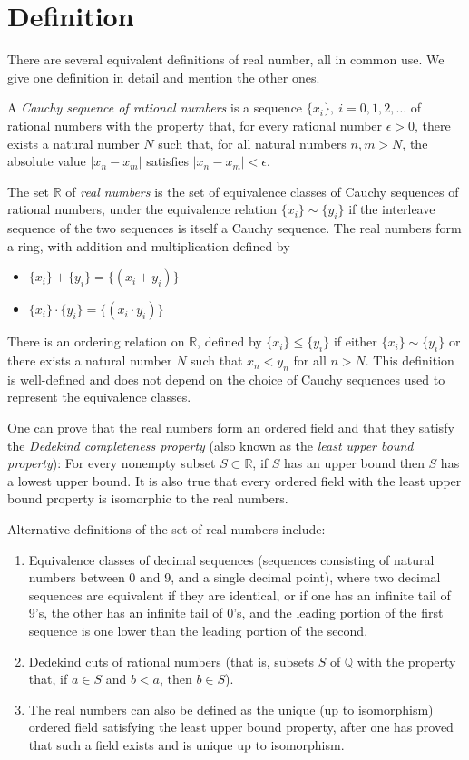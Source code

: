\documentclass[12pt]{article}
\begin{document}
\section{Definition}
There are several equivalent definitions of real number, all in common use. We give one definition in detail and mention the other ones.

A {\em Cauchy sequence of rational numbers} is a sequence $\{x_i\},\ i=0,1,2,\dots$ of rational numbers with the property that, for every rational number $\epsilon > 0$, there exists a natural number $N$ such that, for all natural numbers $n,m > N$, the absolute value $|x_n - x_m|$ satisfies $|x_n - x_m| < \epsilon$.

The set $\mathbb{R}$ of {\em real numbers} is the set of equivalence classes of Cauchy sequences of rational numbers, under the equivalence relation $\{x_i\} \sim \{y_i\}$ if the interleave sequence of the two sequences is itself a Cauchy sequence.
The real numbers form a ring, with addition and multiplication defined by
\begin{itemize}
\item $\{x_i\} + \{y_i\} = \{(x_i+y_i)\}$
\item $\{x_i\} \cdot \{y_i\} = \{(x_i \cdot y_i)\}$
\end{itemize}
There is an ordering relation on $\mathbb{R}$, defined by $\{x_i\} \leq \{y_i\}$ if either $\{x_i\} \sim \{y_i\}$ or there exists a natural number $N$ such that $x_n < y_n$ for all $n > N$. This definition is well-defined and does not depend on the choice of Cauchy sequences used to represent the equivalence classes.

One can prove that the real numbers form an ordered field and that they satisfy the \emph{Dedekind completeness property} (also known as the \emph{least upper bound property}): For every nonempty subset $S \subset \mathbb{R}$, if $S$ has an upper bound then $S$ has a lowest upper bound. It is also true that every ordered field with the least upper bound property is isomorphic to the real numbers.

Alternative definitions of the set of real numbers include:
\begin{enumerate}
\item Equivalence classes of decimal sequences (sequences consisting of natural numbers between 0 and 9, and a single decimal point), where two decimal sequences are equivalent if they are identical, or if one has an infinite tail of 9's, the other has an infinite tail of 0's, and the leading portion of the first sequence is one lower than the leading portion of the second.
\item Dedekind cuts of rational numbers (that is, subsets $S$ of $\mathbb{Q}$ with the property that, if $a \in S$ and $b < a$, then $b \in S$).
\item The real numbers can also be defined as the unique (up to isomorphism) ordered field satisfying the least upper bound property, after one has proved that such a field exists and is unique up to isomorphism.
\end{enumerate}
\end{document}
